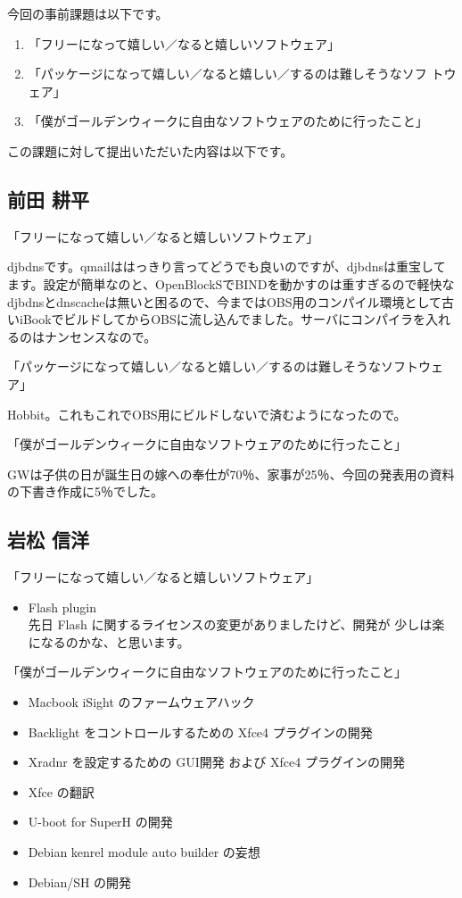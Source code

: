 \documentclass[mingoth,a4paper]{jsarticle}
\begin{document}

今回の事前課題は以下です。

\begin{enumerate}
 \item 「フリーになって嬉しい／なると嬉しいソフトウェア」
 \item 「パッケージになって嬉しい／なると嬉しい／するのは難しそうなソフ
       トウェア」
 \item 「僕がゴールデンウィークに自由なソフトウェアのために行ったこと」
\end{enumerate}

この課題に対して提出いただいた内容は以下です。
\begin{multicols}{2}
\subsection{前田 耕平}

「フリーになって嬉しい／なると嬉しいソフトウェア」

djbdnsです。qmailははっきり言ってどうでも良いのですが、djbdnsは重宝してます。設定が簡単なのと、OpenBlockSでBINDを動かすのは重すぎるので軽快なdjbdnsとdnscacheは無いと困るので、今まではOBS用のコンパイル環境として古いiBookでビルドしてからOBSに流し込んでました。サーバにコンパイラを入れるのはナンセンスなので。

「パッケージになって嬉しい／なると嬉しい／するのは難しそうなソフトウェア」

Hobbit。これもこれでOBS用にビルドしないで済むようになったので。

「僕がゴールデンウィークに自由なソフトウェアのために行ったこと」

GWは子供の日が誕生日の嫁への奉仕が70％、家事が25％、今回の発表用の資料の下書き作成に5％でした。
\subsection{岩松 信洋}

「フリーになって嬉しい／なると嬉しいソフトウェア」
\begin{itemize}
 \item   Flash plugin\\
 先日 Flash に関するライセンスの変更がありましたけど、開発が
 少しは楽になるのかな、と思います。
\end{itemize}

「僕がゴールデンウィークに自由なソフトウェアのために行ったこと」

\begin{itemize}
 \item   Macbook iSight のファームウェアハック
 \item  Backlight をコントロールするための Xfce4 プラグインの開発
 \item  Xradnr を設定するための GUI開発 および Xfce4 プラグインの開発
 \item  Xfce の翻訳
 \item  U-boot for SuperH の開発
 \item  Debian kenrel module auto builder の妄想
 \item  Debian/SH の開発
\end{itemize}



\end{multicols}
\end{document}
